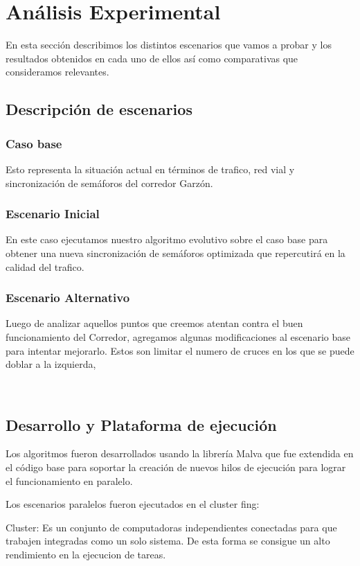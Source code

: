 \chapter{Análisis Experimental}
En esta sección describimos los distintos escenarios que vamos a probar y los resultados obtenidos en cada uno de ellos así como comparativas que consideramos relevantes.

\section{Descripción de escenarios}

\subsection{Caso base}
Esto representa la situación actual en términos de trafico, red vial y sincronización de semáforos del corredor Garzón. 

\subsection{Escenario Inicial }
En este caso ejecutamos nuestro algoritmo evolutivo sobre el caso base para obtener una nueva sincronización de semáforos optimizada que repercutirá en la calidad del trafico.

\subsection{Escenario Alternativo}
Luego de analizar aquellos puntos que creemos atentan contra el buen funcionamiento del Corredor, agregamos algunas modificaciones al escenario base para intentar mejorarlo. 
Estos son limitar el numero de cruces en los que se puede doblar a la izquierda, 

\

\section{Desarrollo y Plataforma de ejecución }
Los algoritmos fueron desarrollados usando la librería Malva que fue extendida en el código base para soportar la creación de nuevos hilos de ejecución para lograr el funcionamiento en paralelo.



Los escenarios paralelos fueron ejecutados en el cluster fing:

Cluster: Es un conjunto de computadoras independientes conectadas para que trabajen integradas como un solo sistema. De esta forma se consigue un alto rendimiento en la ejecucion de tareas. 

